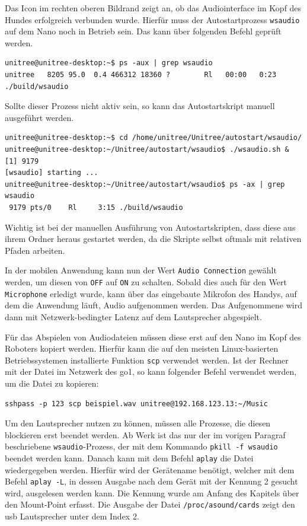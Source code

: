 Das Icon im rechten oberen Bildrand zeigt an, ob das Audiointerface im Kopf des Hundes erfolgreich verbunden wurde.
Hierfür muss der Autostartprozess \texttt{wsaudio} auf dem Nano noch in Betrieb sein.
Das kann über folgenden Befehl geprüft werden.

\begin{lstlisting}
unitree@unitree-desktop:~$ ps -aux | grep wsaudio
unitree   8205 95.0  0.4 466312 18360 ?        Rl   00:00   0:23 ./build/wsaudio
\end{lstlisting}

\noindent Sollte dieser Prozess nicht aktiv sein, so kann das Autostartskript manuell ausgeführt werden.

\begin{lstlisting}
unitree@unitree-desktop:~$ cd /home/unitree/Unitree/autostart/wsaudio/
unitree@unitree-desktop:~/Unitree/autostart/wsaudio$ ./wsaudio.sh &
[1] 9179
[wsaudio] starting ...
unitree@unitree-desktop:~/Unitree/autostart/wsaudio$ ps -ax | grep wsaudio
 9179 pts/0    Rl     3:15 ./build/wsaudio
\end{lstlisting}

\noindent Wichtig ist bei der manuellen Ausführung von Autostartskripten, dass diese aus ihrem Ordner heraus gestartet werden,
da die Skripte selbst oftmals mit relativen Pfaden arbeiten.

In der mobilen Anwendung kann nun der Wert \texttt{Audio Connection} gewählt werden, um diesen von \texttt{OFF} auf
\texttt{ON} zu schalten.
Sobald dies auch für den Wert \texttt{Microphone} erledigt wurde, kann über das eingebaute Mikrofon des Handys, auf dem
die Anwendung läuft, Audio aufgenommen werden.
Das Aufgenommene wird dann mit Netzwerk-bedingter Latenz auf dem Lautsprecher abgespielt.


Für das Abspielen von Audiodateien müssen diese erst auf den Nano im Kopf des Roboters kopiert werden.
Hierfür kann die auf den meisten Linux-basierten Betriebssystemen installierte Funktion \texttt{scp} verwendet werden.
Ist der Rechner mit der Datei im Netzwerk des \gls{go1}, so kann folgender Befehl verwendet werden, um die Datei zu kopieren:

\begin{lstlisting}
sshpass -p 123 scp beispiel.wav unitree@192.168.123.13:~/Music
\end{lstlisting}

Um den Lautsprecher nutzen zu können, müssen alle Prozesse, die diesen blockieren erst beendet werden.
Ab Werk ist das nur der im vorigen Paragraf beschriebene \texttt{wsaudio}-Prozess, der mit dem Kommando \texttt{pkill -f wsaudio}
beendet werden kann.
Danach kann mit dem Befehl \texttt{aplay} die Datei wiedergegeben werden.
Hierfür wird der Gerätename benötigt, welcher mit dem Befehl \texttt{aplay -L}, in dessen Ausgabe nach dem Gerät mit
der Kennung \num{2} gesucht wird, ausgelesen werden kann.
Die Kennung wurde am Anfang des Kapitels über den Mount-Point erfasst.
Die Ausgabe der Datei \texttt{/proc/\allowbreak asound/\allowbreak cards} zeigt den \gls{usb} Lautsprecher unter dem Index \num{2}.


